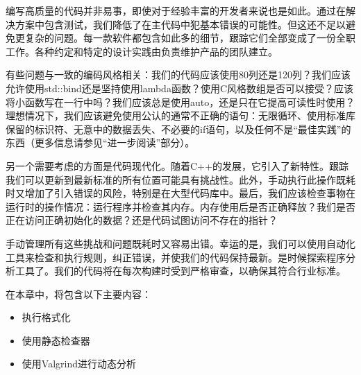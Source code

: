 编写高质量的代码并非易事，即使对于经验丰富的开发者来说也是如此。通过在解决方案中包含测试，我们降低了在主代码中犯基本错误的可能性。但这还不足以避免更复杂的问题。每一款软件都包含如此多的细节，跟踪它们全部变成了一份全职工作。各种约定和特定的设计实践由负责维护产品的团队建立。

有些问题与一致的编码风格相关：我们的代码应该使用80列还是120列？我们应该允许使用std::bind还是坚持使用lambda函数？使用C风格数组是否可以接受？应该将小函数写在一行中吗？我们应该总是使用auto，还是只在它提高可读性时使用？理想情况下，我们应该避免使用公认的通常不正确的语句：无限循环、使用标准库保留的标识符、无意中的数据丢失、不必要的if语句，以及任何不是“最佳实践”的东西（更多信息请参见“进一步阅读”部分）。

另一个需要考虑的方面是代码现代化。随着C++的发展，它引入了新特性。跟踪我们可以更新到最新标准的所有位置可能具有挑战性。此外，手动执行此操作既耗时又增加了引入错误的风险，特别是在大型代码库中。最后，我们应该检查事物在运行时的操作情况：运行程序并检查其内存。内存使用后是否正确释放？我们是否正在访问正确初始化的数据？还是代码试图访问不存在的指针？

手动管理所有这些挑战和问题既耗时又容易出错。幸运的是，我们可以使用自动化工具来检查和执行规则，纠正错误，并使我们的代码保持最新。是时候探索程序分析工具了。我们的代码将在每次构建时受到严格审查，以确保其符合行业标准。

在本章中，将包含以下主要内容：

\begin{itemize}
\item
执行格式化

\item
使用静态检查器

\item
使用Valgrind进行动态分析
\end{itemize}